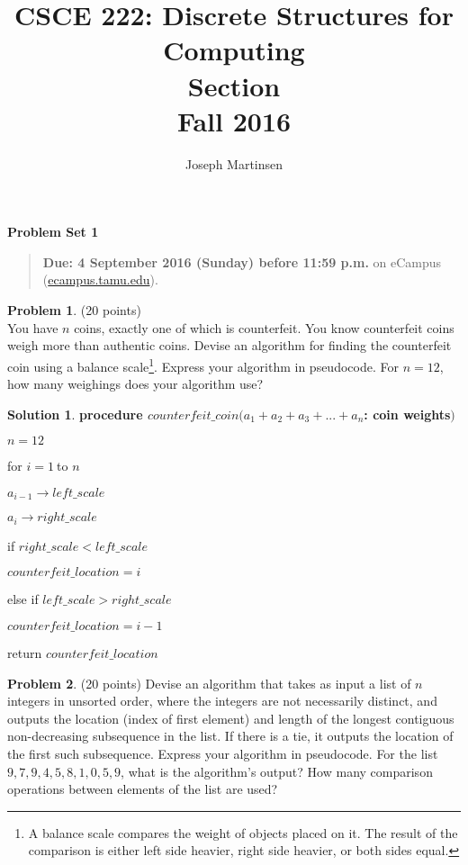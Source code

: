 \documentclass{article}
\title{CSCE 222: Discrete Structures for Computing\\Section \mysectionnumber\\Fall 2016}
\author{Joseph Martinsen}
\theoremstyle{definition}
\newtheorem{problem}{Problem}
\newtheorem*{solution}{Solution}
\newcommand{\problemset}[1]{\begin{center}\textbf{Problem Set #1}\end{center}}
\newcommand{\duedate}[1]{\begin{quote}\textbf{Due: #1} on eCampus (\url{ecampus.tamu.edu}).\end{quote}}
\begin{document}
\maketitle

\problemset{1}

\duedate{4 September 2016 (Sunday) before 11:59 p.m.}

\bigskip

\begin{problem} (20 points)\\
You have $n$ coins, exactly one of which is counterfeit.  You know counterfeit coins weigh more than authentic coins.  Devise an algorithm for finding the counterfeit coin using a balance scale\footnote{A balance scale compares the weight of objects placed on it.  The result of the comparison is either left side heavier, right side heavier, or both sides equal.}.  Express your algorithm in pseudocode.  For $n=12$, how many weighings does your algorithm use? 
\end{problem}

\begin{solution}

\item \bf procedure $counterfeit\_coin(a_{1}+a_{2}+a_{3}+...+a_{n}$: coin weights$)$

$n=12$

for $i=1\ $to $n$

\qquad $a_{i-1}\rightarrow left\_scale$

\qquad $a_{i}\rightarrow right\_scale$ 

\qquad if $right\_scale<left\_scale$

\qquad \qquad $counterfeit\_location=i$

\qquad else if $left\_scale>right\_scale$

\qquad \qquad $counterfeit\_location=i-1$

return $counterfeit\_location$

\end{solution}

\newpage

\begin{problem}
(20 points)\newline
Devise an algorithm that takes as input a list of $n$ integers in unsorted
order, where the integers are not necessarily distinct, and outputs the
location (index of first element) and length of the longest contiguous
non-decreasing subsequence in the list. If there is a tie, it outputs the
location of the first such subsequence. Express your algorithm in
pseudocode. For the list $9,7,9,4,5,8,1,0,5,9$, what is the algorithm's
output? How many comparison operations between elements of the list are used?
\end{problem}
\end{document}
